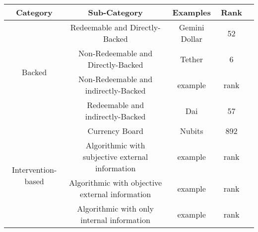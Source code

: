 \begin{table}[h!]
\centering

\begin{tabular}{|c|c|c|c|l|}

\hline
\rowcolor{LightSteelBlue}
\textbf{Category} & \textbf{Sub-Category}    					         & \textbf{Examples} & Rank \\  \hline

\multirow{4}{*}{Backed} 		                                                                 & Redeemable and Directly-Backed  & Gemini Dollar & 52 \\ \cline{2-2}
                                                                                                                 & Non-Redeemable and Directly-Backed  & Tether & 6 \\ \cline{2-2}
                                                                                                                 & Non-Redeemable and indirectly-Backed  & example & rank \\ \cline{2-2}
                                                                                                                 & Redeemable and indirectly-Backed & Dai & 57 \\  \hline
                                                                                                                 
                                                                                                                 
                                                                                                                 
                                                                                                                 
\multirow{4}{*}{Intervention-based}                                                           & Currency Board  & Nubits & 892 \\ \cline{2-2}
                                                                                                                 & Algorithmic with subjective external information  & example & rank \\ \cline{2-2}
                                                                                                                 & Algorithmic with objective external information  & example & rank \\ \cline{2-2}
                                                                                                                 & Algorithmic with only internal information & example & rank \\ \hline
                                                                                                                 

\end{tabular}
\end{table}
